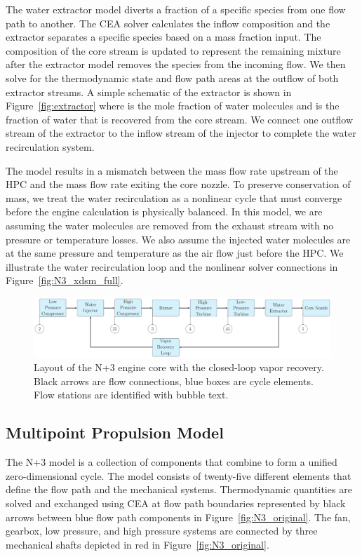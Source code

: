 \documentclass[conf]{new-aiaa}
\begin{document}
The water extractor model diverts a fraction of a specific species from one flow path to another.
The CEA solver calculates the inflow composition and the extractor separates a specific species based on a mass fraction input.
The composition of the core stream is updated to represent the remaining mixture after the extractor model removes the species from the incoming flow.
We then solve for the thermodynamic state and flow path areas at the outflow of both extractor streams.
A simple schematic of the extractor is shown in Figure~\ref{fig:extractor} where  is the mole fraction of water molecules and  is the fraction of water that is recovered from the core stream.
We connect one outflow stream of the extractor to the inflow stream of the injector to complete the water recirculation system.

The model results in a mismatch between the mass flow rate upstream of the HPC and the mass flow rate exiting the core nozzle.
To preserve conservation of mass, we treat the water recirculation as a nonlinear cycle that must converge before the engine calculation is physically balanced.
In this model, we are assuming the water molecules are removed from the exhaust stream with no pressure or temperature losses.
We also assume the injected water molecules are at the same pressure and temperature as the air flow just before the HPC.
We illustrate the water recirculation loop and the nonlinear solver connections in Figure~\ref{fig:N3_xdsm_full}.

\begin{figure}[hbt!]
    \centering
    \includegraphics[width=1.0\textwidth]{N3_CLVR_cycle.pdf}
    \caption{
        Layout of the N+3 engine core with the closed-loop vapor recovery.
        Black arrows are flow connections, blue boxes are cycle elements.
        Flow stations are identified with bubble text.
    }
    \label{fig:n3_clvr}
\end{figure}

\subsection{Multipoint Propulsion Model}
The N+3 model is a collection of components that combine to form a unified zero-dimensional cycle.
The model consists of twenty-five different elements that define the flow path and the mechanical systems.
Thermodynamic quantities are solved and exchanged using CEA at flow path boundaries represented by black arrows between blue flow path components in Figure~\ref{fig:N3_original}.
The fan, gearbox, low pressure, and high pressure systems are connected by three mechanical shafts depicted in red in Figure~\ref{fig:N3_original}.
\end{document}
